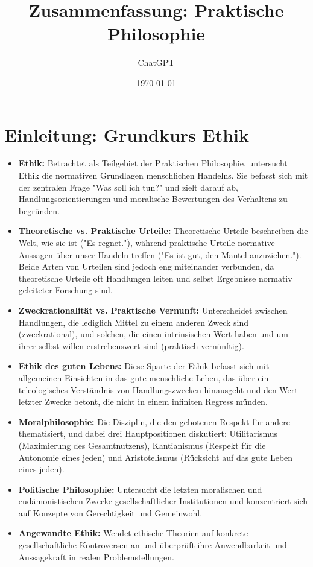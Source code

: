 \documentclass{article}
\title{Zusammenfassung: Praktische Philosophie}
\date{\today}
\author{ChatGPT}
\begin{document}
\maketitle
\tableofcontents
\newpage



\section{Einleitung: Grundkurs Ethik}

\begin{itemize}
	\item \textbf{Ethik:} Betrachtet als Teilgebiet der Praktischen Philosophie, untersucht Ethik die normativen Grundlagen menschlichen Handelns. Sie befasst sich mit der zentralen Frage "Was soll ich tun?" und zielt darauf ab, Handlungsorientierungen und moralische Bewertungen des Verhaltens zu begründen.

	\item \textbf{Theoretische vs. Praktische Urteile:} Theoretische Urteile beschreiben die Welt, wie sie ist ("Es regnet."), während praktische Urteile normative Aussagen über unser Handeln treffen ("Es ist gut, den Mantel anzuziehen."). Beide Arten von Urteilen sind jedoch eng miteinander verbunden, da theoretische Urteile oft Handlungen leiten und selbst Ergebnisse normativ geleiteter Forschung sind.

	\item \textbf{Zweckrationalität vs. Praktische Vernunft:} Unterscheidet zwischen Handlungen, die lediglich Mittel zu einem anderen Zweck sind (zweckrational), und solchen, die einen intrinsischen Wert haben und um ihrer selbst willen erstrebenswert sind (praktisch vernünftig).

	\item \textbf{Ethik des guten Lebens:} Diese Sparte der Ethik befasst sich mit allgemeinen Einsichten in das gute menschliche Leben, das über ein teleologisches Verständnis von Handlungszwecken hinausgeht und den Wert letzter Zwecke betont, die nicht in einem infiniten Regress münden.

	\item \textbf{Moralphilosophie:} Die Disziplin, die den gebotenen Respekt für andere thematisiert, und dabei drei Hauptpositionen diskutiert: Utilitarismus (Maximierung des Gesamtnutzens), Kantianismus (Respekt für die Autonomie eines jeden) und Aristotelismus (Rücksicht auf das gute Leben eines jeden).

	\item \textbf{Politische Philosophie:} Untersucht die letzten moralischen und eudämonistischen Zwecke gesellschaftlicher Institutionen und konzentriert sich auf Konzepte von Gerechtigkeit und Gemeinwohl.

	\item \textbf{Angewandte Ethik:} Wendet ethische Theorien auf konkrete gesellschaftliche Kontroversen an und überprüft ihre Anwendbarkeit und Aussagekraft in realen Problemstellungen.
\end{itemize}
\newpage
\end{document}
